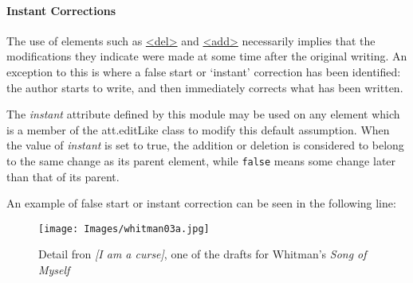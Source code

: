 \paragraph[{Instant Corrections}]{Instant Corrections}\label{instantcorr}\par
The use of elements such as \hyperref[TEI.del]{<del>} and \hyperref[TEI.add]{<add>} necessarily implies that the modifications they indicate were made at some time after the original writing. An exception to this is where a false start or ‘instant’ correction has been identified: the author starts to write, and then immediately corrects what has been written.\par
The {\itshape instant} attribute defined by this module may be used on any element which is a member of the \textsf{att.editLike} class to modify this default assumption. When the value of {\itshape instant} is set to true, the addition or deletion is considered to belong to the same change as its parent element, while \texttt{false} means some change later than that of its parent.\par
An example of false start or instant correction can be seen in the following line: \begin{figure}[htbp]
\noindent\noindent\texttt{[image: Images/whitman03a.jpg]}
\caption{Detail fron \textit{[I am a curse]}, one of the drafts for Whitman's \textit{Song of Myself}}\end{figure}

